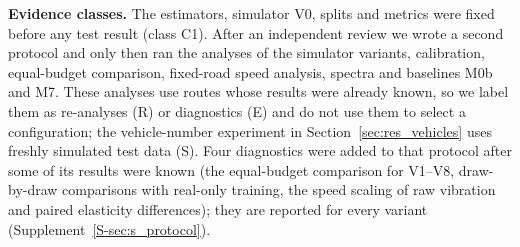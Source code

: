 \textbf{Evidence classes.}
The estimators, simulator V0, splits and metrics were fixed before any test result (class C1).
After an independent review we wrote a second protocol and only then ran the analyses of the simulator variants, calibration, equal-budget comparison, fixed-road speed analysis, spectra and baselines M0b and M7.
These analyses use routes whose results were already known, so we label them as re-analyses (R) or diagnostics (E) and do not use them to select a configuration; the vehicle-number experiment in Section~\ref{sec:res_vehicles} uses freshly simulated test data (S).
Four diagnostics were added to that protocol after some of its results were known (the equal-budget comparison for V1--V8, draw-by-draw comparisons with real-only training, the speed scaling of raw vibration and paired elasticity differences); they are reported for every variant (Supplement~\ref{S-sec:s_protocol}).
